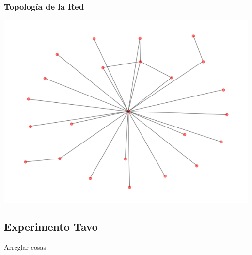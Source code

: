 \subsubsection{Topolog\'ia de la Red}
\begin{center}
 \includegraphics[scale=0.6]{../plots/trabajo_s2_topologia.png}
\end{center}

\subsection{Experimento Tavo}

Arreglar cosas